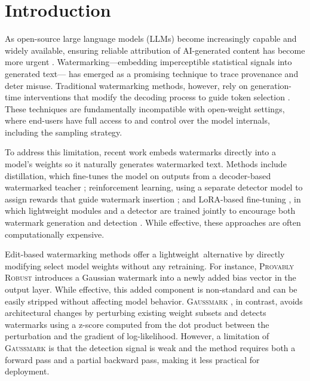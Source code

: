 \section{Introduction}

As open-source large language models (LLMs) become increasingly capable and widely available, ensuring reliable attribution of AI-generated content has become more urgent
. Watermarking—embedding imperceptible statistical signals into generated text—
has emerged as a promising technique to trace provenance and deter misuse. Traditional watermarking methods, however, rely on generation-time interventions that modify the decoding process to guide token selection \cite{kirchenbauer2023watermark}. These techniques are fundamentally incompatible with open-weight settings, where end-users have full access to and control over the model internals, including the sampling strategy.

To address this limitation, recent work embeds watermarks directly into a model's weights so it naturally generates watermarked text. Methods include distillation, which fine-tunes the model on outputs from a decoder-based watermarked teacher \cite{gu2023learnability}; reinforcement learning, using a separate detector model to assign rewards that guide watermark insertion \cite{xu2024learningwatermarkllmgeneratedtext}; and LoRA-based fine-tuning \cite{hu2022lora}, in which lightweight modules and a detector are trained jointly to encourage both watermark generation and detection \cite{elhassan2025can}. While effective, these approaches are often computationally expensive.

Edit-based watermarking methods 
offer a lightweight alternative by directly modifying select model weights without any retraining. For instance, \textsc{Provably Robust} \cite{christ2024provably} introduces a Gaussian watermark into a newly added bias vector in the output layer. 
While effective, this added component is non-standard and can be easily stripped without affecting model behavior. \textsc{Gaussmark} \cite{block2025gaussmark}, in contrast, avoids architectural changes by perturbing existing weight subsets and detects watermarks using a z-score computed from the dot product between the perturbation and the gradient of log-likelihood. However, a limitation of \textsc{Gaussmark} is that the detection signal is weak and the method requires both a forward pass and a partial backward pass, making it less practical for deployment.

